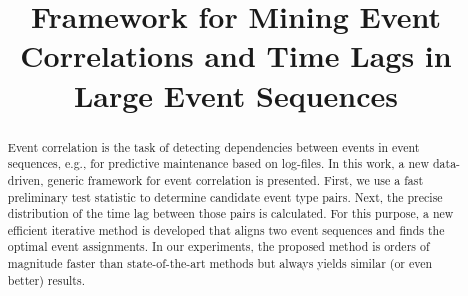 \documentclass[conference]{IEEEtran}
\theoremstyle{examplestyle}
\begin{document}
\begin{acronym}
\end{acronym}



\title{Framework for Mining Event Correlations and Time Lags in Large Event Sequences}


\author{
\and
{}
}
 



\maketitle


\begin{abstract}
Event correlation is the task of detecting dependencies between events in event sequences, e.g., for predictive maintenance based on log-files.
In this work, a new data-driven, generic framework for event correlation is presented. 
First, we use a fast preliminary test statistic to determine candidate event type pairs. Next, the precise distribution of the time lag between those pairs is calculated. 
For this purpose, a new efficient iterative method is developed that aligns two event sequences and finds the optimal event assignments.
In our experiments, the proposed method is orders of magnitude faster than state-of-the-art methods but always yields similar (or even better) results.

\end{abstract}






\IEEEpeerreviewmaketitle
\end{document}
